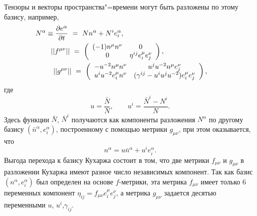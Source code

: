 Тензоры и векторы пространства"=времени могут быть разложены по этому базису, например,
\begin{gather}
  N^\alpha\equiv \frac{\partial e^\alpha}{\partial t}~=~Nn^\alpha+N^ie^\alpha_i, \hspace{5.1cm}  \\
||f^{\mu\nu}||~=~\left(\begin{array}{cc}(-1)n^\mu n^\nu & 0\\0 & \eta^{ij}e^\mu_i e^\nu_j\end{array}\right), \hspace{2.3cm} \\
||g^{\mu\nu}||~=~
\left(
\begin{array}{cc}
-u^{-2}n^\mu n^\nu & u^ju^{-2}n^\mu e^\nu_j\\
u^iu^{-2}e^\mu_i n^\nu & (\gamma^{ij}-u^iu^ju^{-2})e^\mu_i e^\nu_j
\end{array}\right), 
\end{gather}
где
$$
u=\frac{\bar N}{N}, \qquad u^i=\frac{\bar N^i-N^i}{N}.
$$
Здесь функции $\bar N$, $\bar N^i$ получаются как компоненты разложения $N^\alpha$ по другому базису $(\bar n^\alpha,e^\alpha_i)$, построенному с помощью метрики $g_{\mu\nu}$, при этом оказывается, что
$$
 n^{\alpha}=u{\bar n}^{\alpha}+u^i
e^{\alpha}_i.
$$
Выгода перехода к базису Кухаржа состоит в том, что две метрики $f_{\mu\nu}$ и $g_{\mu\nu}$ в разложении Кухаржа имеют разное число независимых компонент. Так как базис
 $(n^\alpha,e^\alpha_i)$  был определен на основе $f$-метрики, эта метрика $f_{\mu\nu}$ имеет только 6 переменных компонент  $\eta_{ij}=f_{\mu\nu}e^\mu_i e^\nu_j$, а метрика $g_{\mu\nu}$ задается десятью переменными $u$, $u^i$,$\gamma_{ij}$.


